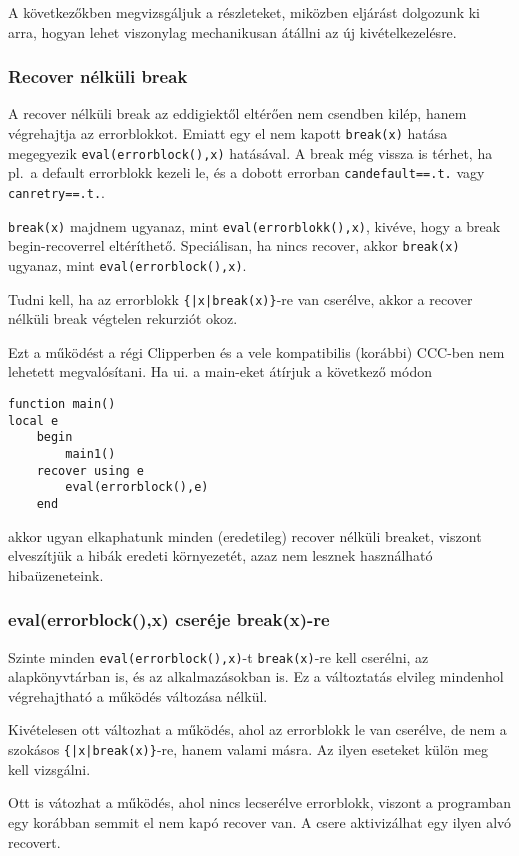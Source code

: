 A következőkben megvizsgáljuk a részleteket, 
miközben eljárást dolgozunk ki arra,
hogyan lehet viszonylag mechanikusan átállni
az új kivételkezelésre.


\subsubsection{Recover nélküli break}

A recover nélküli break az eddigiektől eltérően nem csendben
kilép, hanem végrehajtja az errorblokkot. Emiatt egy el nem kapott
\verb!break(x)! hatása megegyezik \verb!eval(errorblock(),x)! hatásával.
A break még vissza is térhet, ha pl.\ a default errorblokk kezeli le, 
és a dobott errorban \verb!candefault==.t.! vagy \verb!canretry==.t.!.

\szab \verb!break(x)! majdnem ugyanaz, mint 
\verb!eval(errorblokk(),x)!, kivéve, hogy a break begin-recoverrel 
eltéríthető. Speciálisan, ha nincs recover, akkor 
\verb!break(x)! ugyanaz, mint \verb!eval(errorblock(),x)!.

\megj
Tudni kell, ha az errorblokk \verb!{|x|break(x)}!-re van cserélve,
akkor a recover nélküli break végtelen rekurziót okoz.

\megj
Ezt a működést a régi Clipperben és a vele kompatibilis (korábbi)
CCC-ben nem lehetett megvalósítani. Ha ui. a main-eket átírjuk a 
következő módon
\begin{verbatim}
function main()
local e
    begin
        main1()
    recover using e
        eval(errorblock(),e)
    end
\end{verbatim}
akkor ugyan elkaphatunk minden (eredetileg) recover nélküli breaket, 
viszont elveszítjük a hibák eredeti környezetét, azaz nem lesznek 
használható hibaüzeneteink.


\subsubsection{{ eval(errorblock(),x)} cseréje { break(x)}-re}

Szinte minden  \verb!eval(errorblock(),x)!-t \verb!break(x)!-re kell cserélni,
az alapkönyvtárban is, és az alkalmazásokban is. Ez a változtatás 
elvileg mindenhol végrehajtható a működés változása nélkül. 

Kivételesen ott változhat a működés, ahol az  errorblokk le van 
cserélve, de nem a szokásos \verb!{|x|break(x)}!-re, hanem valami másra. 
Az ilyen eseteket külön meg kell vizsgálni.

Ott is vátozhat a működés, ahol nincs lecserélve errorblokk,
viszont a prog\-ramban egy korábban semmit el nem kapó recover van.
A csere aktivizálhat egy ilyen alvó recovert.


